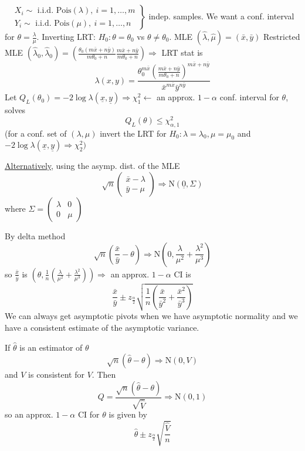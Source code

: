 \documentclass[english, 11pt]{article}
\newcommand{\lp}{\left(}
\newcommand{\rp}{\right)}
\begin{document}
\begin{exmp}\label{exmp:616}
$\left.\begin{aligned}
&X_i\sim\text{ i.i.d. Pois}(\lambda),~i=1, \dots, m\\
&Y_i\sim\text{ i.i.d. Pois}(\mu),~i=1, \dots, n
\end{aligned}\right\}$ indep. samples. We want a conf. interval for $\theta=\frac{\lambda}{\mu}$. Inverting LRT: $H_0:\theta=\theta_0$ vs $\theta\not=\theta_0$. MLE $(\hat{\lambda}, \hat{\mu})=(\bar{x}, \bar{y})$ Restricted MLE $(\hat{\lambda}_0, \hat{\lambda}_0)=\lp\frac{\theta_0(m\bar{x}+n\bar{y})}{m\theta_0+n}\frac{m\bar{x}+n\bar{y}}{m\theta_0+n}\rp\Rightarrow$ LRT stat is
$$
\lambda(x, y)=\frac{\theta_0^{m\bar{x}}\lp\frac{m\bar{x}+n\bar{y}}{m\theta_0+n}\rp^{m\bar{x}+n\bar{y}}}{\bar{x}^{m\bar{x}}\bar{y}^{n\bar{y}}}
$$
Let $Q_L(\theta_0)=-2\log\lambda(\underline{x}, \underline{y})\Rightarrow\chi^2_1\leftarrow$ an approx. $1-\alpha$ conf. interval for $\theta$, solves
$$
Q_L(\theta)\leqslant\chi^2_{\alpha ,1}
$$
(for a conf. set of $(\lambda, \mu)$ invert the LRT for $H_0:\lambda=\lambda_0, \mu=\mu_0$ and $-2\log\lambda(\underline{x}, \underline{y})\Rightarrow\chi^2_2)$

\underline{Alternatively}, using the asymp. dist. of the MLE
$$
\sqrt{n}\left(\begin{matrix}
\bar{x}-\lambda\\
\bar{y}-\mu
\end{matrix}\right)\Rightarrow\text{N}(\underline{0}, \Sigma)
$$
where $\Sigma=\left(\begin{matrix}
\lambda & 0\\
0 & \mu
\end{matrix}\right)$

By delta method
$$
\sqrt{n}\lp\frac{\bar{x}}{\bar{y}}-\theta\rp\Rightarrow\text{N}\lp 0, \frac{\lambda}{\mu^2}+\frac{\lambda^2}{\mu^3}\rp
$$
so $\frac{\bar{x}}{\bar{y}}$ is $\lp\theta, \frac{1}{n}\lp\frac{\lambda}{\mu^2}+\frac{\lambda^2}{\mu^3}\rp\rp\Rightarrow$ an approx. $1-\alpha$ CI is
$$
\frac{\bar{x}}{\bar{y}}\pm z_{\frac{\alpha}{2}}\sqrt{\frac{1}{n}\lp\frac{\bar{x}}{\bar{y}^2}+\frac{\bar{x}^2}{\bar{y}^3}\rp}
$$
We can always get asymptotic pivots when we have asymptotic normality and we have a consistent estimate of the asymptotic variance.

If $\hat{\theta}$ is an estimator of $\theta$
$$
\sqrt{n}(\hat{\theta}-\theta)\Rightarrow\text{N}(0, V)
$$
and $V$ is consistent for $V$. Then 
$$
Q=\frac{\sqrt{n}(\hat{\theta}-\theta)}{\sqrt{\hat{V}}}\Rightarrow\text{N}(0, 1)
$$
so an approx. $1-\alpha$ CI for $\theta$ is given by 
$$
\hat{\theta}\pm z_{\frac{\alpha}{2}}\sqrt{\frac{\hat{V}}{n}}
$$
\end{exmp}
\end{document}
